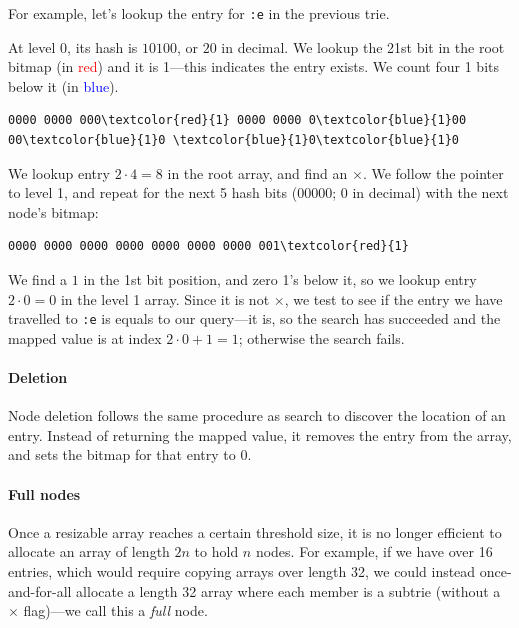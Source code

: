 \documentclass[preprint]{sigplanconf}
\begin{document}
For example, let's lookup the entry
for \texttt{:e} in the previous trie.

At level 0, its hash is $10100$, or
$20$ in decimal.
We lookup the 21st bit in the root
bitmap (in \textcolor{red}{red}) and it is 1---this
indicates the entry exists.
We count four 1 bits below it (in \textcolor{blue}{blue}).

\begin{Verbatim}[commandchars=\\\{\},codes={\catcode`$=3\catcode`^=7\catcode`_=8}]
0000 0000 000\textcolor{red}{1} 0000 0000 0\textcolor{blue}{1}00 00\textcolor{blue}{1}0 \textcolor{blue}{1}0\textcolor{blue}{1}0
\end{Verbatim}

We lookup entry $2\cdot4 = 8$ in
the root array, and find an $\times$.
We follow the pointer to level 1, and
repeat for the next 5 hash bits ($00000$; $0$ in decimal)
with the next node's bitmap:

\begin{Verbatim}[commandchars=\\\{\},codes={\catcode`$=3\catcode`^=7\catcode`_=8}]
0000 0000 0000 0000 0000 0000 0000 001\textcolor{red}{1}
\end{Verbatim}

We find a $1$ in the 1st bit position, and zero
1's below it, so we lookup entry
$2\cdot0 = 0$ in the level 1 array.
Since it is not $\times$, we test
to see if the entry we have travelled
to \texttt{:e} is equals to 
our query---it is, so the search has
succeeded and the mapped value is at index
$2\cdot0+1 = 1$; otherwise
the search fails.

\paragraph{Deletion}
Node deletion follows the same procedure as search to
discover the location of an entry.
Instead of returning the mapped value, it removes
the entry from the array, and sets the bitmap
for that entry to 0.

\paragraph{Full nodes}
Once a resizable array reaches a certain threshold
size, it is no longer efficient to allocate
an array of length $2n$ to hold $n$ nodes.
For example, if we have over 16 entries, which
would require copying arrays over length 32, we could
instead once-and-for-all allocate a length 32
array where each member is a subtrie
(without a $\times$ flag)---we call this a \textit{full}
node.
\end{document}
